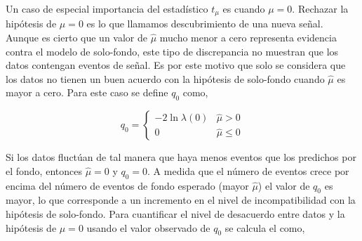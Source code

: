 



Un caso de especial importancia del estadístico $t_\mu$ es cuando $\mu=0$.
Rechazar la hipótesis de $\mu=0$ es lo
que llamamos descubrimiento de una nueva señal.
Aunque es cierto que un valor de $\hat{\mu}$ mucho menor a cero representa
evidencia contra el modelo de solo-fondo, este tipo de discrepancia no muestran
que los datos contengan eventos de señal. Es por este motivo que solo se
considera que los datos no tienen un buen acuerdo con la hipótesis de solo-fondo
cuando $\hat{\mu}$ es mayor a cero.
Para este caso se define $q_0$ como,

\begin{equation}
  q_0 =
  \begin{cases}
    -2 \ln \lambda(0) & \hat{\mu} > 0 \\
    0 & \hat{\mu} \leq 0
  \end{cases}
\end{equation}

Si los datos fluctúan de tal manera que haya menos eventos que los predichos por
el fondo, entonces $\hat{\mu} = 0$ y $q_0=0$. A medida que el número de
eventos crece por encima del número de eventos de fondo esperado (mayor
$\hat{\mu}$) el valor de $q_0$ es mayor, lo que corresponde a un incremento en
el nivel de incompatibilidad con la hipótesis de solo-fondo. Para cuantificar el
nivel de desacuerdo entre datos y la hipótesis de $\mu=0$ usando el valor
observado de $q_0$ se calcula el {\pvalue} como,

